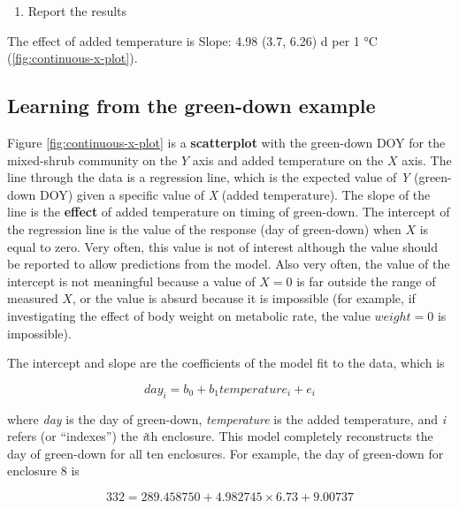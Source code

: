 \documentclass[]{book}
\providecommand{\tightlist}{%
  \setlength{\itemsep}{0pt}\setlength{\parskip}{0pt}}
\begin{document}
\begin{enumerate}
\def\labelenumi{\arabic{enumi}.}
\setcounter{enumi}{6}
\tightlist
\item
  Report the results
\end{enumerate}

The effect of added temperature is Slope: 4.98 (3.7, 6.26) d per 1 °C (\ref{fig:continuous-x-plot}).

\hypertarget{learning-from-the-green-down-example}{%
\subsection{Learning from the green-down example}\label{learning-from-the-green-down-example}}

Figure \ref{fig:continuous-x-plot} is a \textbf{scatterplot} with the green-down DOY for the mixed-shrub community on the \(Y\) axis and added temperature on the \(X\) axis. The line through the data is a regression line, which is the expected value of \emph{Y} (green-down DOY) given a specific value of \emph{X} (added temperature). The slope of the line is the \textbf{effect} of added temperature on timing of green-down. The intercept of the regression line is the value of the response (day of green-down) when \(X\) is equal to zero. Very often, this value is not of interest although the value should be reported to allow predictions from the model. Also very often, the value of the intercept is not meaningful because a value of \(X = 0\) is far outside the range of measured \(X\), or the value is absurd because it is impossible (for example, if investigating the effect of body weight on metabolic rate, the value \(weight = 0\) is impossible).

The intercept and slope are the coefficients of the model fit to the data, which is

\begin{equation}
day_i = b_0 + b_1 temperature_i + e_i
\label{eq:continuous-x-fit}
\end{equation}

where \emph{day} is the day of green-down, \emph{temperature} is the added temperature, and \emph{i} refers (or ``indexes'') the \emph{i}th enclosure. This model completely reconstructs the day of green-down for all ten enclosures. For example, the day of green-down for enclosure 8 is

\begin{equation}
332 = 289.458750 + 4.982745 \times 6.73 + 9.00737
\end{equation}
\end{document}
